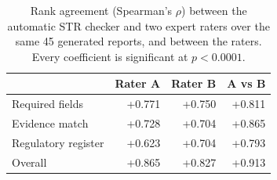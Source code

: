 \begin{table}[t]
\centering
\footnotesize
\caption{Rank agreement (Spearman's $\rho$) between the automatic STR checker and two expert raters over the same 45 generated reports, and between the raters. Every coefficient is significant at $p<0.0001$.}
\label{tab:str_human_agreement}
\begin{tabular}{lrrr}
\toprule
 & \textbf{Rater A} & \textbf{Rater B} & \textbf{A vs B} \\
\midrule
Required fields & +0.771 & +0.750 & +0.811 \\
Evidence match & +0.728 & +0.704 & +0.865 \\
Regulatory register & +0.623 & +0.704 & +0.793 \\
Overall & +0.865 & +0.827 & +0.913 \\
\bottomrule
\end{tabular}
\end{table}
